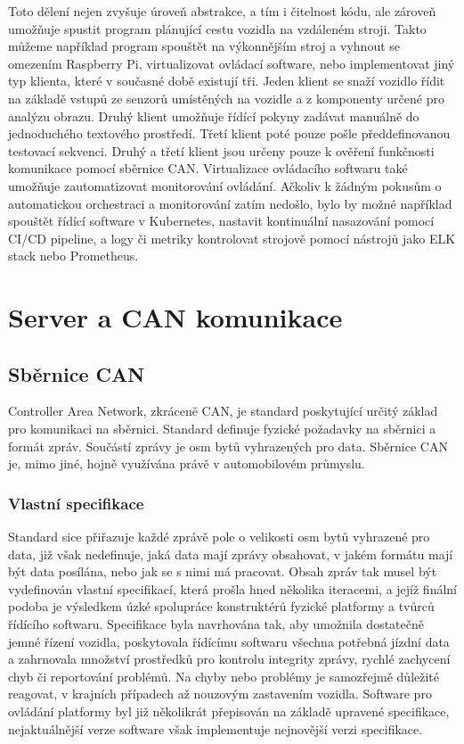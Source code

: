 \documentclass[czech,bachelor,dept460,male,cpp,cpdeclaration]{diploma}
\begin{document}
Toto dělení nejen zvyšuje úroveň abstrakce, a tím i čitelnost kódu, ale zároveň umožňuje spustit program plánující 
cestu vozidla na vzdáleném stroji. Takto můžeme například program spouštět na výkonnějším stroj a vyhnout se omezením 
Raspberry Pi, virtualizovat ovládací software, nebo implementovat jiný typ klienta, které v současné době existují tři.
Jeden klient se snaží vozidlo řídit na základě vstupů ze senzorů umístěných na vozidle a z komponenty určené pro analýzu obrazu. 
Druhý klient umožňuje řídící pokyny zadávat manuálně do jednoduchého textového prostředí. Třetí klient poté pouze pošle 
předdefinovanou testovací sekvenci. Druhý a třetí klient jsou určeny pouze k ověření funkčnosti komunikace pomocí sběrnice CAN. 
Virtualizace ovládacího softwaru také umožňuje zautomatizovat monitorování ovládání. Ačkoliv k žádným pokusům o automatickou 
orchestraci a monitorování zatím nedošlo, bylo by možné například spouštět řídící software v Kubernetes, nastavit kontinuální 
nasazování pomocí CI/CD pipeline, a logy či metriky kontrolovat strojově pomocí nástrojů jako ELK stack nebo Prometheus.

\section{Server a CAN komunikace}

\subsection{Sběrnice CAN}

Controller Area Network, zkráceně CAN, je standard poskytující určitý základ pro komunikaci na sběrnici. Standard definuje
fyzické požadavky na sběrnici a formát zpráv. Součástí zprávy je osm bytů vyhrazených pro data. Sběrnice CAN je, mimo jiné, hojně
využívána právě v automobilovém průmyslu.

\subsubsection{Vlastní specifikace}
Standard sice přiřazuje každé zprávě pole o velikosti osm bytů vyhrazené pro data, již však nedefinuje, jaká data mají zprávy 
obsahovat, v jakém formátu mají být data posílána, nebo jak se s nimi má pracovat. Obsah zpráv tak musel být vydefinován vlastní 
specifikací, která prošla hned několika iteracemi, a jejíž finální podoba je výsledkem úzké spolupráce konstruktérů fyzické 
platformy a tvůrců řídícího softwaru. Specifikace byla navrhována tak, aby umožnila dostatečně jemné řízení vozidla, poskytovala 
řídícímu softwaru všechna potřebná jízdní data a zahrnovala množství prostředků pro kontrolu integrity zprávy, rychlé zachycení 
chyb či reportování problémů. Na chyby nebo problémy je samozřejmě důležité reagovat, v krajních případech až nouzovým zastavením
vozidla. Software pro ovládání platformy byl již několikrát přepisován na základě upravené specifikace, nejaktuálnější verze 
software však implementuje nejnovější verzi specifikace.
\end{document}
